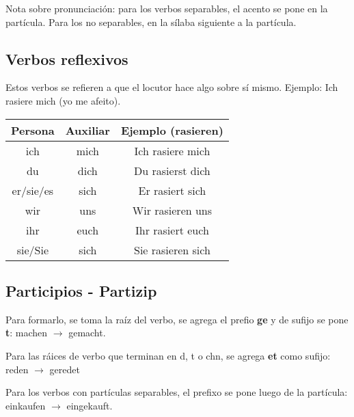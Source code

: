 Nota sobre pronunciación: para los verbos separables, el acento se pone en la partícula. Para los no separables, en la sílaba siguiente a la partícula.

\subsection{Verbos reflexivos}
Estos verbos se refieren a que el locutor hace algo sobre sí mismo. Ejemplo: Ich rasiere mich (yo me afeito).

\begin{tabular}{|c | c c |}
\hline
\textbf{Persona} & \textbf{Auxiliar} & \textbf{Ejemplo (rasieren)}\\
\hline
ich & mich & Ich rasiere mich\\
du & dich & Du rasierst dich\\
er/sie/es & sich & Er rasiert sich\\
wir & uns & Wir rasieren uns\\
ihr & euch & Ihr rasiert euch \\
sie/Sie & sich & Sie rasieren sich\\
\hline
\end{tabular}


\subsection{Participios - Partizip}
Para formarlo, se toma la raíz del verbo, se agrega el prefio \textbf{ge} y de sufijo se pone \textbf{t}: machen $\rightarrow$ gemacht.

Para las ráices de verbo que terminan en d, t o chn, se agrega \textbf{et} como sufijo: reden $\rightarrow$ geredet

Para los verbos con partículas separables, el prefixo se pone luego de la partícula: einkaufen $\rightarrow$ eingekauft.

